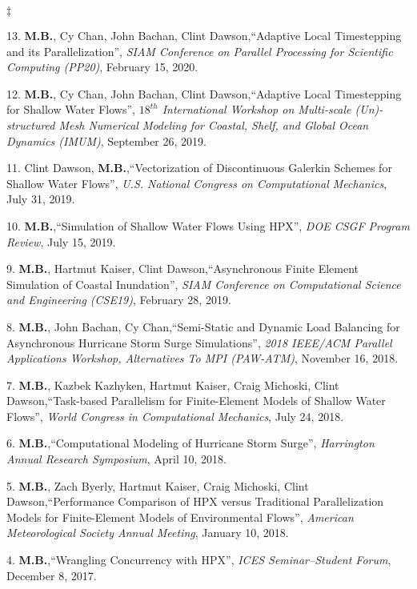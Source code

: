 \documentclass[margin,line]{res}
\newenvironment{list2}{
  \begin{list}{$\ddagger$}{%
      \setlength{\itemsep}{0in}
      \setlength{\parsep}{0in} \setlength{\parskip}{0in}
      \setlength{\topsep}{0in} \setlength{\partopsep}{0in}
      \setlength{\leftmargin}{0.2in}}}{\end{list}}
\newcommand{\talk}[4]{%
#1,``#2'', {\it #3}, #4.%
}
\begin{document}
\begin{resume}
\begin{list2}
\item[13.] \talk{{\bf M.B.}, Cy Chan, John Bachan, Clint Dawson}{Adaptive Local Timestepping and its Parallelization}{SIAM Conference on Parallel Processing for Scientific Computing (PP20)}{February 15, 2020}

\item[12.] \talk{{\bf M.B.}, Cy Chan, John Bachan, Clint Dawson}{Adaptive Local Timestepping for Shallow Water Flows}{$18^{th}$ International Workshop on Multi-scale (Un)-structured Mesh Numerical Modeling for Coastal, Shelf, and Global Ocean Dynamics (IMUM)}{September 26, 2019}

\item[11.] \talk{Clint Dawson, {\bf M.B.}}{Vectorization of Discontinuous Galerkin Schemes for Shallow Water Flows}{U.S. National Congress on Computational Mechanics}{July 31, 2019}

\item[10.] \talk{{\bf M.B.}}{Simulation of Shallow Water Flows Using HPX}{DOE CSGF Program Review}{July 15, 2019}

\item[9.] \talk{{\bf M.B.}, Hartmut Kaiser, Clint Dawson}{Asynchronous Finite Element Simulation of Coastal Inundation}{SIAM Conference on Computational Science and Engineering (CSE19)}{February 28, 2019}

\item[8.] \talk{{\bf M.B.}, John Bachan, Cy Chan}{Semi-Static and Dynamic Load Balancing for Asynchronous Hurricane Storm Surge Simulations}{2018 IEEE/ACM Parallel Applications Workshop, Alternatives To MPI (PAW-ATM)}{November 16, 2018}

\item[7.] \talk{{\bf M.B.}, Kazbek Kazhyken, Hartmut Kaiser, Craig Michoski, Clint Dawson}{Task-based Parallelism for Finite-Element Models of Shallow Water Flows}{World Congress in Computational Mechanics}{July 24, 2018}

\item[6.] \talk{{\bf M.B.}}{Computational Modeling of Hurricane Storm Surge}{Harrington Annual Research Symposium}{April 10, 2018}

\item[5.] \talk{{\bf M.B.}, Zach Byerly, Hartmut Kaiser, Craig Michoski, Clint Dawson}{Performance Comparison of HPX versus Traditional Parallelization Models for Finite-Element Models of Environmental Flows}{American Meteorological Society Annual Meeting}{January 10, 2018}

\item[4.] \talk{{\bf M.B.}}{Wrangling Concurrency with HPX}{ICES Seminar--Student Forum}{December 8, 2017}


\end{list2}
\end{resume}
\end{document}

